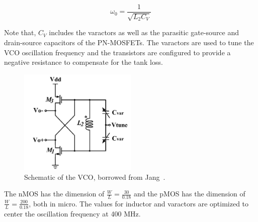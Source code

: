 \begin{equation}
\omega_{0} = \frac{1}{\sqrt{L_2C_V}}
\end{equation}

Note that, $C_V$ includes the varactors as well as the parasitic gate-source and drain-source capacitors of the PN-MOSFETs. The varactors are used to tune the VCO oscillation frequency and the transistors are configured to provide a negative resistance to compensate for the tank loss. 

\begin{figure}[h]
   \centering
    \includegraphics[width=0.50\textwidth]{figures/VCO.png}
    \caption{Schematic of the VCO, borrowed from Jang~\cite{vco}.}
    \label{fig:vco}
\end{figure}


The nMOS has the dimension of $\frac{W}{L}=\frac{30}{0.18}$ and the pMOS has the dimension of $\frac{W}{L}=\frac{200}{0.18}$, both in micro. The values for inductor and varactors are optimized to center the oscillation frequency at 400 MHz.

